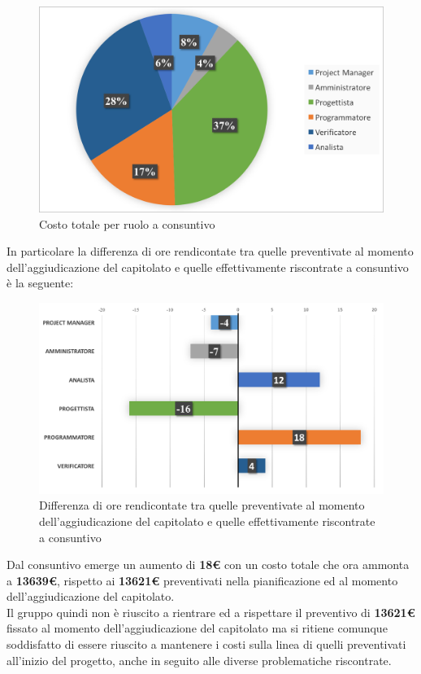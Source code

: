 \begin{figure}[H]
	\centering 
	\includegraphics[scale=0.7]{Immagini/GraficiCONS/DIFFCONS.png}
	\caption{Costo totale per ruolo a consuntivo}
\end{figure}

\newpage
In particolare la differenza di ore rendicontate tra quelle preventivate al momento dell'aggiudicazione del capitolato e quelle effettivamente riscontrate a consuntivo è la seguente:

\begin{figure}[H]
	\centering 
	\includegraphics[scale=0.7]{Immagini/GraficiCONS/DIFFORARIA.png}
	\caption{Differenza di ore rendicontate tra quelle preventivate al momento dell'aggiudicazione del capitolato e quelle effettivamente riscontrate a consuntivo}
\end{figure}

Dal consuntivo emerge un aumento di \textbf{18\euro} con un costo totale che ora ammonta a \textbf{13639\euro}, rispetto ai \textbf{13621\euro} preventivati nella pianificazione ed al momento dell'aggiudicazione del capitolato.\\
Il gruppo quindi non è riuscito a rientrare ed a rispettare il preventivo di \textbf{13621\euro} fissato al momento dell'aggiudicazione del capitolato ma si ritiene comunque soddisfatto di essere riuscito a mantenere i costi sulla linea di quelli preventivati all'inizio del progetto, anche in seguito alle diverse problematiche riscontrate.